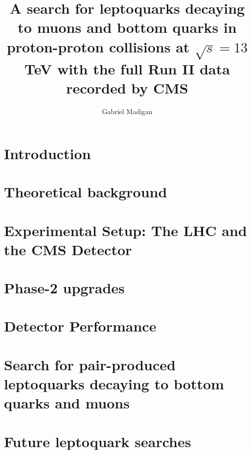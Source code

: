 \documentclass[thesis]{neu}
\title{
A search for leptoquarks decaying to muons and bottom quarks in proton-proton collisions at \texorpdfstring{$\sqrt{s}=13$}{center-of-mass energies = 13} TeV with the full Run II data recorded by CMS 
}
\author{Gabriel Madigan}
\begin{document}
\newpage 

 


\chapter{Introduction} \label{chapter:Introduction}


\chapter{Theoretical background} \label{chapter:Theory}


\chapter{Experimental Setup: The LHC and the CMS Detector} \label{chapter:Experiment}


\chapter{Phase-2 upgrades} \label{chapter:Phase2Upgrades}


\chapter{Detector Performance} \label{chapter:DetectorPerformance}


\chapter{Search for pair-produced leptoquarks decaying to bottom quarks and muons} \label{chapter:LeptoquarkSearch}
   

\chapter{Future leptoquark searches} \label{chapter:FutureLQSearches}

\end{document}
